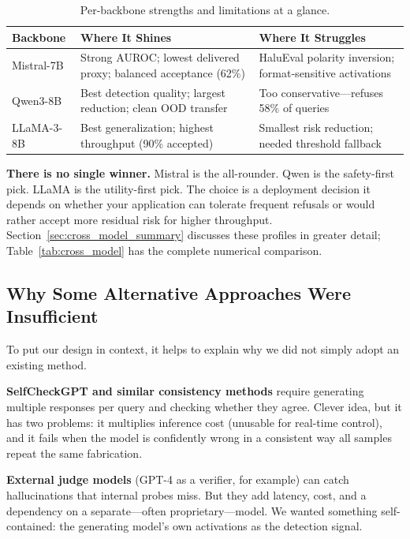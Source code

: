 \begin{table}[!htb]
\centering
\caption{Per-backbone strengths and limitations at a glance.}
\label{tab:backbone_strengths}
\small
\begin{tabular}{@{}l p{5.5cm} p{5.5cm}@{}}
\toprule
\textbf{Backbone} & \textbf{Where It Shines} & \textbf{Where It Struggles} \\
\midrule
Mistral-7B & Strong AUROC; lowest delivered proxy; balanced acceptance (62\%) & HaluEval polarity inversion; format-sensitive activations \\[4pt]
Qwen3-8B & Best detection quality; largest reduction; clean OOD transfer & Too conservative—refuses 58\% of queries \\[4pt]
LLaMA-3-8B & Best generalization; highest throughput (90\% accepted) & Smallest risk reduction; needed threshold fallback \\
\bottomrule
\end{tabular}
\end{table}

\textbf{There is no single winner.} Mistral is the all-rounder. Qwen is the safety-first pick. LLaMA is the utility-first pick. The choice is a deployment decision it depends on whether your application can tolerate frequent refusals or would rather accept more residual risk for higher throughput. Section~\ref{sec:cross_model_summary} discusses these profiles in greater detail; Table~\ref{tab:cross_model} has the complete numerical comparison.

\subsection{Why Some Alternative Approaches Were Insufficient}
\label{subsec:alternative_methods}

To put our design in context, it helps to explain why we did not simply adopt an existing method.

\textbf{SelfCheckGPT and similar consistency methods} require generating multiple responses per query and checking whether they agree. Clever idea, but it has two problems: it multiplies inference cost (unusable for real-time control), and it fails when the model is confidently wrong in a consistent way all samples repeat the same fabrication.

\textbf{External judge models} (GPT-4 as a verifier, for example) can catch hallucinations that internal probes miss. But they add latency, cost, and a dependency on a separate—often proprietary—model. We wanted something self-contained: the generating model's own activations as the detection signal.

